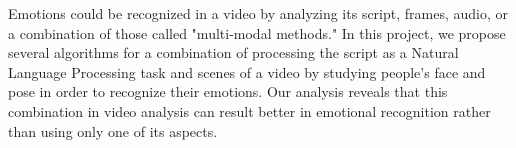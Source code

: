 

Emotions could be recognized in a video by analyzing its script, frames, audio, or a combination of those called "multi-modal methods." In this project, we propose several algorithms for a combination of processing the script as a Natural Language Processing task and scenes of a video by studying people's face and pose in order to recognize their emotions. Our analysis reveals that this combination in video analysis can result better in emotional recognition rather than using only one of its aspects.